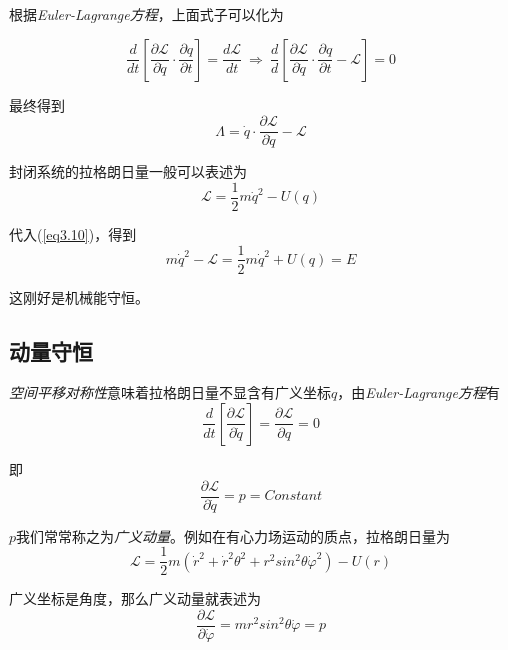 根据\textsl{Euler-Lagrange方程}，上面式子可以化为

\begin{equation}
    \frac{d}{dt}\left[\frac{\partial \mathcal{L}}{\partial \dot{q}}\cdot \frac{\partial q}{\partial t}\right]=\frac{d\mathcal{L}}{dt}
    \ \Rightarrow\ \frac{d}{d}\left[\frac{\partial \mathcal{L}}{\partial \dot{q}}\cdot \frac{\partial q}{\partial t}-\mathcal{L}\right]=0
\end{equation}

最终得到
\begin{equation}
    \varLambda=\dot{q}\cdot\frac{\partial\mathcal{L}}{\partial\dot{q}}-\mathcal{L}
    \label{eq3.10}
\end{equation}

封闭系统的拉格朗日量一般可以表述为
\begin{equation}
    \mathcal{L}=\frac{1}{2}m\dot{q}^2-U(q)
\end{equation}

代入(\ref{eq3.10})，得到
\begin{equation}
    m\dot{q}^2-\mathcal{L}=\frac{1}{2}m\dot{q}^2+U(q)=E
\end{equation}

这刚好是机械能守恒。


\subsection*{动量守恒}

\textsl{空间平移对称性}意味着拉格朗日量不显含有广义坐标$q$，由\textsl{Euler-Lagrange方程}有
\begin{equation}
    \frac{d}{dt}\left[\frac{\partial \mathcal{L}}{\partial \dot{q}}\right]=\frac{\partial \mathcal{L}}{\partial q}=0
\end{equation}

即
\begin{equation}
    \frac{\partial \mathcal{L}}{\partial \dot{q}}=p=Constant
\end{equation}

$p$我们常常称之为\textsl{广义动量}。例如在有心力场运动的质点，拉格朗日量为
\begin{equation}
    \mathcal{L}=\frac{1}{2}m(\dot{r}^2+\dot{r}^2\theta^2+r^2sin^2\theta\dot{\varphi}^2)-U(r)
\end{equation}

广义坐标是角度，那么广义动量就表述为
\begin{equation}
    \frac{\partial \mathcal{L}}{\partial \dot{\varphi}}=mr^2sin^2\theta\dot{\varphi}=p
\end{equation}

